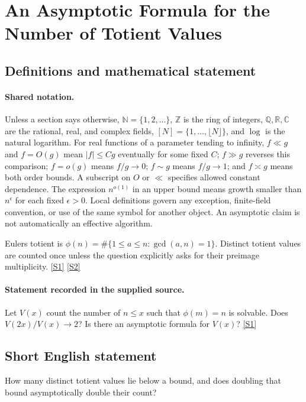 \documentclass[11pt,a4paper]{article}
\newcommand{\N}{\mathbb{N}}
\newcommand{\Z}{\mathbb{Z}}
\newcommand{\Q}{\mathbb{Q}}
\newcommand{\R}{\mathbb{R}}
\newcommand{\C}{\mathbb{C}}
\newcommand{\sref}[2]{\hyperlink{source:#1:#2}{[S#2]}}
\begin{document}
\section{An Asymptotic Formula for the Number of Totient Values}\label{statement}


\subsection{Definitions and mathematical statement}

\paragraph{Shared notation.}Unless a section says otherwise, $\N=\{1,2,\ldots\}$,
$\Z$ is the ring of integers, $\Q,\R,\C$ are the rational, real, and complex
fields, $[N]=\{1,\ldots,\lfloor N\rfloor\}$, and $\log$ is the natural
logarithm. For real functions of a parameter tending to infinity,
$f\ll g$ and $f=O(g)$ mean $|f|\leq Cg$ eventually for some fixed $C$;
$f\gg g$ reverses this comparison; $f=o(g)$ means $f/g\to0$;
$f\sim g$ means $f/g\to1$; and $f\asymp g$ means both order bounds.
A subscript on $O$ or $\ll$ specifies allowed constant dependence.
The expression $n^{o(1)}$ in an upper bound means growth smaller than
$n^\epsilon$ for each fixed $\epsilon>0$. Local definitions govern any
exception, finite-field convention, or use of the same symbol for another
object. An asymptotic claim is not automatically an effective algorithm.



Euler\textquotesingle s totient is $\phi(n)=\#\{1\leq a\leq n:\gcd(a,n)=1\}$. Distinct totient values are counted once unless the question explicitly asks for their preimage multiplicity. \sref{statement}{1} \sref{statement}{2}

\paragraph{Statement recorded in the supplied source.}
Let $V(x)$ count the number of $n\leq x$ such that $\phi(m)=n$ is solvable. Does $V(2x)/V(x)\to 2$? Is there an asymptotic formula for $V(x)$? \sref{statement}{1}

\subsection{Short English statement}

How many distinct totient values lie below a bound, and does doubling that bound asymptotically double their count?
\end{document}
